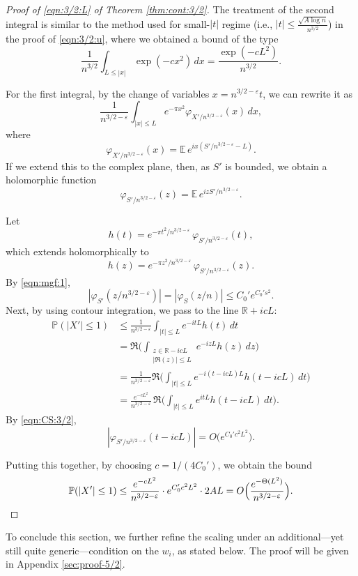 \documentclass[reqno]{amsart}
\newcommand\R{{\mathbb{R}}}
\renewcommand\P{{\mathbb{P}}}
\newcommand\eps{{\varepsilon}}
\theoremstyle{plain}
\theoremstyle{definition}
\begin{document}
\begin{proof}[Proof of \eqref{eqn:3/2:L} of Theorem \ref{thm:cont:3/2}]
The treatment of the second integral is similar to the method used for small-$|t|$ regime (i.e., $|t| \le \frac{\sqrt{A \log n}}{n^{3/2}}$) in the proof of \eqref{eqn:3/2:u}, where we obtained a bound of the type
\[
\frac{1}{n^{3/2}}\int_{L \le |x|} \exp(-c x^{2}) \, dx
= \frac{\exp(-cL^{2})}{n^{3/2}}.
\]

For the first integral, by the change of variables $x = n^{3/2-\eps}t$, we can rewrite it as
\[
\frac{1}{n^{3/2-\eps}}\int_{|x| \le L} e^{-\pi x^{2}} \varphi_{X'/n^{3/2-\eps}}(x) \, dx,
\]
where
\[
\varphi_{X'/n^{3/2-\eps}}(x) = \mathbb{E} \, e^{i x (S'/n^{3/2-\eps} - L)}.
\]
If we extend this to the complex plane, then, as $S'$ is bounded, we obtain a holomorphic function
\[
\varphi_{S'/n^{3/2-\eps}}(z) = \mathbb{E} \, e^{i z S'/n^{3/2-\eps}}.
\]

Let
\[
h(t) = e^{-\pi t^{2}/n^{3/2-\eps}} \, \varphi_{S'/n^{3/2-\eps}}(t),
\]
which extends holomorphically to
\[
h(z) = e^{-\pi z^{2}/n^{3/2-\eps}} \, \varphi_{S'/n^{3/2-\eps}}(z).
\]
By \eqref{eqn:mgf:1},
\begin{equation}\label{eqn:CS:3/2}
|\varphi_{S'}(z/n^{3/2-\eps})| = |\varphi_{S}(z/n)| \le C_{0}' e^{C_{0}' s^{2}}.
\end{equation}
Next, by using contour integration, we pass to the line $\R + icL$:
\begin{align}\label{eqn:contour:3/2}
\P(|X'|\le 1)
&\le \frac{1}{n^{3/2-\eps}} \int_{|t| \le L} e^{-i t L} h(t) \, dt \\
&= \Re \Big( \int_{\substack{z\in \R - icL \\ |\Re(z)| \le L}} e^{-i z L} h(z) \, dz \Big) \nonumber \\
&= \frac{1}{n^{3/2-\eps}} \Re \Big( \int_{|t| \le L} e^{-i(t-icL)L} h(t - icL) \, dt \Big) \nonumber \\
&= \frac{e^{-cL^{2}}}{n^{3/2-\eps}} \, \Re \Big( \int_{|t| \le L} e^{itL} h(t - icL) \, dt \Big). \nonumber
\end{align}
By \eqref{eqn:CS:3/2},
\[
|\varphi_{S'/n^{3/2-\eps}}(t - icL)| = O\Big(e^{C_{0}' c^{2} L^{2}}\Big).
\]

Putting this together, by choosing $c = 1/(4C_{0}')$, we obtain the bound
\[
\P(|X'|\le 1) \le \frac{e^{-cL^{2}}}{n^{3/2-\eps}} \cdot e^{C_{0}' c^{2} L^{2}} \cdot 2A L
= O\Big( \frac{e^{-\Theta(L^{2})}}{n^{3/2-\eps}} \Big).\qedhere
\]
\end{proof}


To conclude this section, we further refine the scaling under
an additional---yet still quite generic---condition on the $w_{i}$, as stated below. The proof will be given in Appendix \ref{sec:proof-5/2}.
\end{document}
